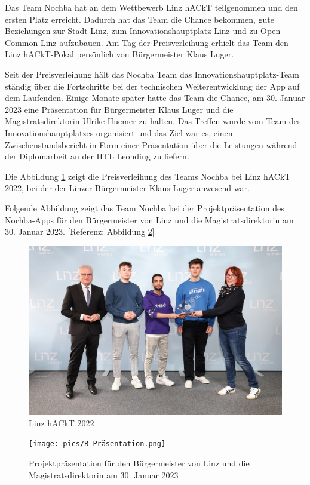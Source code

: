 Das Team Nochba hat an dem Wettbewerb Linz hACkT teilgenommen und den ersten Platz erreicht. Dadurch hat das Team die Chance bekommen, gute Beziehungen zur Stadt Linz, zum Innovationshauptplatz Linz und zu Open Common Linz aufzubauen. Am Tag der Preisverleihung erhielt das Team den Linz hACkT-Pokal persönlich von Bürgermeister Klaus Luger.

Seit der Preisverleihung hält das Nochba Team das Innovationshauptplatz-Team ständig über die Fortschritte bei der technischen Weiterentwicklung der App auf dem Laufenden. Einige Monate später hatte das Team die Chance, am 30. Januar 2023 eine Präsentation für Bürgermeister Klaus Luger und die Magistratsdirektorin Ulrike Huemer zu halten. Das Treffen wurde vom Team des Innovationshauptplatzes organisiert und das Ziel war es, einen Zwischenstandsbericht in Form einer Präsentation über die Leistungen während der Diplomarbeit an der HTL Leonding zu liefern.

Die Abbildung \ref{fig:linz-hackt} zeigt die Preisverleihung des Teams Nochba bei Linz hACkT 2022, bei der der Linzer Bürgermeister Klaus Luger anwesend war.

Folgende Abbildung zeigt das Team Nochba bei der Projektpräsentation des Nochba-Apps für den Bürgermeister von Linz und die Magistratsdirektorin am 30. Januar 2023. [Referenz: Abbildung \ref{fig:Project-presentation-linz-mayor}]

\begin{figure}[H]
    \centering
    \includegraphics[width=1\textwidth]{pics/Linz-hACkT-2022.jpg}
    \caption{Linz hACkT 2022}
    \label{fig:linz-hackt}
\end{figure}

\begin{figure}[H]
    \centering
    \texttt{[image: pics/B-Präsentation.png]}
    \caption{Projektpräsentation für den Bürgermeister von Linz und die Magistratsdirektorin am 30. Januar 2023}
    \label{fig:Project-presentation-linz-mayor}
\end{figure}


